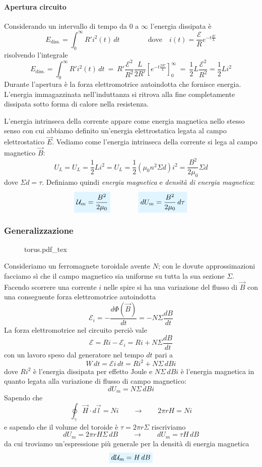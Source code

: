 \documentclass[x11names]{report}
\newcommand{\incfig}[1]{%
	{#1.pdf_tex}
}
\newcommand{\viola}[1]{%
	\colorbox{myblue}{$\displaystyle #1$}
}
\begin{document}
\paragraph{Apertura circuito} 
Considerando un intervallo di tempo da \(0\) a \(\infty\) l'energia dissipata è 
\[
E_{\text{diss.}} = \int_{0}^{\infty} R'i^2(t) \, dt \qquad \qquad \text{dove} \quad i(t) = \frac{\mathcal{E}}{R}e^{-t\frac{R'}{L}} 
\]
risolvendo l'integrale
\[
 E_{\text{diss.}} = \int_{0}^{\infty} R'i^2(t) \, dt \: = \: R'\frac{\mathcal{E}^2}{R^2} \frac{L}{2R'}\left[e^{-t\frac{2R'}{L}}\right]_0^\infty \: = \: \frac{1}{2}L\frac{\mathcal{E}^2}{R^2} = \frac{1}{2}Li^2
\]
Durante l'apertura è la forza elettromotrice autoindotta che fornisce energia. L'energia immagazzinata nell'induttanza si ritrova alla fine completamente dissipata sotto forma di calore nella resistenza.

L'energia intrinseca della corrente appare come energia magnetica nello stesso senso con cui abbiamo definito un'energia elettrostatica legata al campo elettrostatico \(\vec{E}\). Vediamo come l'energia intrinseca della corrente si lega al campo magnetico \(\vec{B}\):
\[
U_L = U_L = \frac{1}{2}Li^2 = U_L = \frac{1}{2}\left(\mu_0 n^2 \Sigma d\right)i^2 = \frac{B^2}{2\mu_0}\Sigma d
\]
dove \(\Sigma d = \tau\). Definiamo quindi \textit{energia magnetica} e \textit{densità di energia magnetica}:
\begin{equation}
	 \viola{\mathcal{U}_m = \frac{B^2}{2\mu_0}}\qquad \qquad \viola{dU_m = \frac{B^2}{2\mu_0} \, d\tau} 
\end{equation}


\subsubsection{Generalizzazione}
\begin{wrapfigure}{r}{0.3\textwidth}
	\incfig{torus}
\end{wrapfigure}
Consideriamo un ferromagnete toroidale avente \(N\); con le dovute approssimazioni facciamo sì che il campo magnetico sia uniforme su tutta la sua sezione \(\Sigma\). Facendo scorrere una corrente \(i\) nelle spire si ha una variazione del flusso di \(\vec{B}\) con una conseguente forza elettromotrice autoindotta
\[
\mathcal{E}_i  =- \frac{d\Phi(\vec{B})}{dt} = -N\Sigma \frac{dB}{dt}
\]
La forza elettromotrice nel circuito perciò vale 
\[
\mathcal{E} = Ri - \mathcal{E}_i = Ri + N\Sigma \frac{dB}{dt}
\]
con un lavoro speso dal generatore nel tempo \(dt\) pari a 
\[
W \, dt = \mathcal{E}i \, dt = Ri^2 + N\Sigma \, dB i
\]
dove \(Ri^2\) è l'energia dissipata per effetto Joule e \(N\Sigma \, dB i\) è l'energia magnetica in quanto legata alla variazione di flusso di campo magnetico:
\[
dU_m = N\Sigma \, dB i
\]
Sapendo che
\[
\oint_\gamma \vec{H} \cdot d\vec{l} = Ni \qquad \to \qquad 2\pi r H = Ni 
\]
e sapendo che il volume del toroide è \(\tau = 2\pi r \Sigma\) riscriviamo
\[
dU_m = 2\pi r H \Sigma  \, dB  \qquad \to \qquad dU_m = \tau H \, dB
\]
da cui troviamo un'espressione più generale per la densità di energia magnetica
\begin{equation}
	\viola{d\mathcal{U}_m = H \, dB}
\end{equation}
\end{document}
